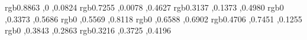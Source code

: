 \pgfplotsset{plot coordinates/math parser=false} 

%


\newlength\figureheight
\newlength\figurewidth 


\usepackage{filemod}

%	
%		
%
%
%

            
\definecolor{BoschRGB1} {rgb}{0.8863    ,0    	  ,0.0824 }
\definecolor{BoschRGB2} {rgb}{0.7255    ,0.0078    ,0.4627}
\definecolor{BoschRGB3} {rgb}{0.3137    ,0.1373    ,0.4980}
\definecolor{BoschRGB4} {rgb}{0    		,0.3373    ,0.5686}
\definecolor{BoschRGB5} {rgb}{0    		,0.5569    ,0.8118}
\definecolor{BoschRGB6} {rgb}{0    		,0.6588    ,0.6902}
\definecolor{BoschRGB7} {rgb}{0.4706    ,0.7451    ,0.1255}
\definecolor{BoschRGB8} {rgb}{0   		,0.3843    ,0.2863}
\definecolor{BoschRGB9} {rgb}{0.3216    ,0.3725    ,0.4196}
